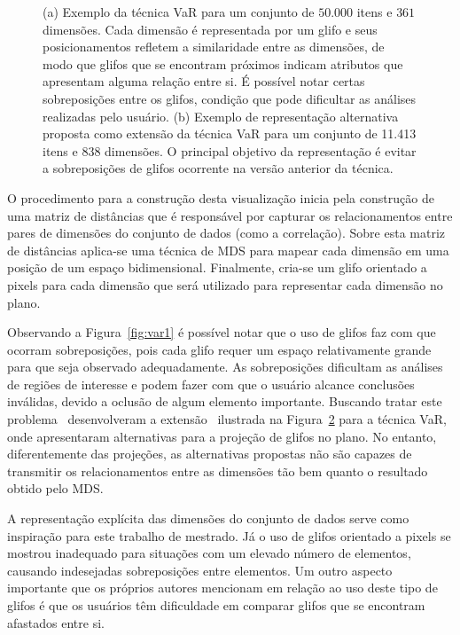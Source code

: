 \begin{figure}[h!]
\begin{subfigure}[b]{0.475\textwidth}
    \caption{}
    \label{fig:var2}
  \end{subfigure}
  \caption[VaR: Value and Relation]{(a) Exemplo da técnica VaR para um conjunto de $50.000$ itens e $361$ dimensões. Cada dimensão é representada por um glifo e seus posicionamentos refletem a similaridade entre as dimensões, de modo que glifos que se encontram próximos indicam atributos que apresentam alguma relação entre si. É possível notar certas sobreposições entre os glifos, condição que pode dificultar as análises realizadas pelo usuário. (b) Exemplo de representação alternativa proposta como extensão da técnica VaR para um conjunto de 11.413 itens e 838 dimensões. O principal objetivo da representação é evitar a sobreposições de glifos ocorrente na versão anterior da técnica.}
\end{figure}

O procedimento para a construção desta visualização inicia pela construção de uma matriz de distâncias que é responsável por capturar os relacionamentos entre pares de dimensões do conjunto de dados (como a correlação). Sobre esta matriz de distâncias aplica-se uma técnica de MDS para mapear cada dimensão em uma posição de um espaço bidimensional. Finalmente, cria-se um glifo orientado a pixels para cada dimensão que será utilizado para representar cada dimensão no plano.


Observando a Figura~\ref{fig:var1} é possível notar que o uso de glifos faz com que ocorram sobreposições, pois cada glifo requer um espaço relativamente grande para que seja observado adequadamente. As sobreposições dificultam as análises de regiões de interesse e podem fazer com que o usuário alcance conclusões inválidas, devido a oclusão de algum elemento importante. Buscando tratar este problema~\citeauthor{Yang2007} desenvolveram a extensão~\cite{Yang2007} ilustrada na Figura~\ref{fig:var2} para a técnica VaR, onde apresentaram alternativas para a projeção de glifos no plano. No entanto, diferentemente das projeções, as alternativas propostas não são capazes de transmitir os relacionamentos entre as dimensões tão bem quanto o resultado obtido pelo MDS.

A representação explícita das dimensões do conjunto de dados serve como inspiração para este trabalho de mestrado. Já o uso de glifos orientado a pixels se mostrou inadequado para situações com um elevado número de elementos, causando indesejadas sobreposições entre elementos. Um outro aspecto importante que os próprios autores mencionam em relação ao uso deste tipo de  glifos é que os usuários têm dificuldade em comparar glifos que se encontram afastados entre si. 

